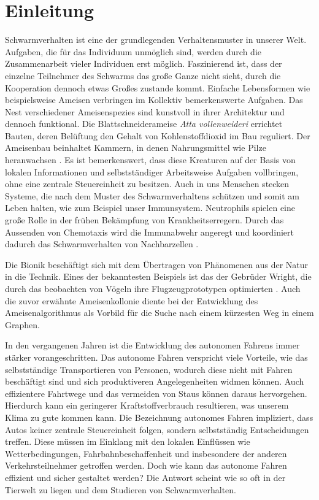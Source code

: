 
\chapter{Einleitung} %
\label{cha:einleitung}

Schwarmverhalten ist eine der grundlegenden Verhaltensmuster in unserer Welt. 
Aufgaben, die für das Individuum unmöglich sind, werden durch die Zusammenarbeit vieler Individuen erst möglich.
Faszinierend ist, dass der einzelne Teilnehmer des Schwarms das große Ganze nicht sieht, durch die Kooperation dennoch etwas Großes zustande kommt. Einfache Lebensformen wie beispielsweise Ameisen verbringen im Kollektiv bemerkenswerte Aufgaben.
Das Nest verschiedener Ameisenspezies sind kunstvoll in ihrer Architektur und dennoch funktional.
Die Blattschneiderameise \textit{Atta vollenweideri} errichtet Bauten, deren Belüftung den Gehalt von Kohlenstoffdioxid im Bau reguliert. Der Ameisenbau beinhaltet Kammern, in denen Nahrungsmittel wie Pilze heranwachsen \cite{HalbothRoces2017}. 
Es ist bemerkenswert, dass diese Kreaturen auf der Basis von lokalen Informationen und selbstständiger Arbeitsweise Aufgaben vollbringen, ohne eine zentrale Steuereinheit zu besitzen. Auch in uns Menschen stecken Systeme, die nach dem Muster des Schwarmverhaltens schützen und somit am Leben halten, wie zum Beispiel unser Immunsystem. Neutrophils spielen eine große Rolle in der frühen Bekämpfung von Krankheitserregern. Durch das Aussenden von Chemotaxis wird die Immunabwehr angeregt und koordiniert dadurch das Schwarmverhalten von Nachbarzellen \cite{doi:10.1126/science.abe7729}.

Die Bionik beschäftigt sich mit dem Übertragen von Phänomenen aus der Natur in die Technik. Eines der bekanntesten Beispiels ist das der Gebrüder Wright, die durch das beobachten von Vögeln ihre Flugzeugprototypen optimierten \cite{wrightbrothers}.
Auch die zuvor erwähnte Ameisenkollonie diente bei der Entwicklung des Ameisenalgorithmus als Vorbild für die Suche nach einem kürzesten Weg in einem Graphen.

In den vergangenen Jahren ist die Entwicklung des autonomen Fahrens immer stärker vorangeschritten. Das autonome Fahren verspricht viele Vorteile, wie das selbstständige Transportieren von Personen, wodurch diese nicht mit Fahren beschäftigt sind und sich produktiveren Angelegenheiten widmen können. Auch effizientere Fahrtwege und das vermeiden von Staus können daraus hervorgehen.
Hierdurch kann ein geringerer Kraftstoffverbrauch resultieren, was unserem Klima zu gute kommen kann.
Die Bezeichnung autonomes Fahren impliziert, dass Autos keiner zentrale Steuereinheit folgen, sondern selbstständig Entscheidungen treffen. Diese müssen im Einklang mit den lokalen Einflüssen wie Wetterbedingungen, Fahrbahnbeschaffenheit und insbesondere der anderen Verkehrsteilnehmer getroffen werden. Doch wie kann das autonome Fahren effizient und sicher gestaltet werden?
Die Antwort scheint wie so oft in der Tierwelt zu liegen und dem Studieren von Schwarmverhalten.

